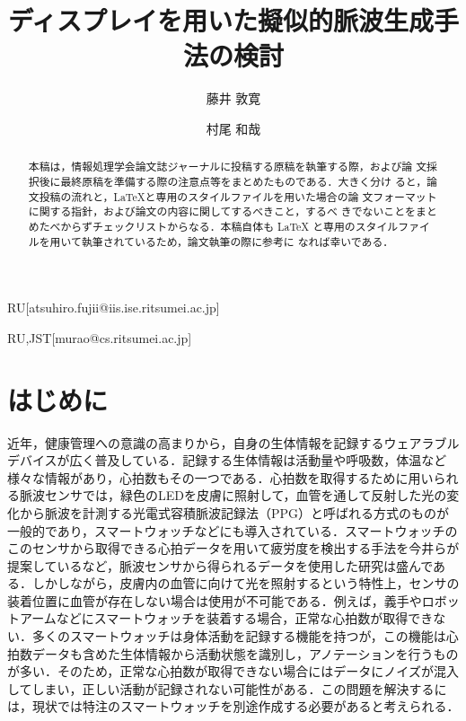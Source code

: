 \documentclass[submit,techrep]{ipsj}
\begin{document}
\title{ディスプレイを用いた擬似的脈波生成手法の検討}


\author{藤井 敦寛}{}{RU}[atsuhiro.fujii@iis.ise.ritsumei.ac.jp]
\author{村尾 和哉}{}{RU,JST}[murao@cs.ritsumei.ac.jp]

\begin{abstract}
	本稿は，情報処理学会論文誌ジャーナルに投稿する原稿を執筆する際，および論
	文採択後に最終原稿を準備する際の注意点等をまとめたものである．大きく分け
	ると，論文投稿の流れと，\LaTeX と専用のスタイルファイルを用いた場合の論
	文フォーマットに関する指針，および論文の内容に関してするべきこと，するべ
	きでないことをまとめたべからずチェックリストからなる．本稿自体も \LaTeX
	と専用のスタイルファイルを用いて執筆されているため，論文執筆の際に参考に
	なれば幸いである．
\end{abstract}

\maketitle

\section{はじめに}
\label{introduction}
近年，健康管理への意識の高まりから，自身の生体情報を記録するウェアラブルデバイスが広く普及している．記録する生体情報は活動量や呼吸数，体温など様々な情報があり，心拍数もその一つである．心拍数を取得するために用いられる脈波センサでは，緑色のLEDを皮膚に照射して，血管を通して反射した光の変化から脈波を計測する光電式容積脈波記録法（PPG）と呼ばれる方式のものが一般的であり，スマートウォッチなどにも導入されている．スマートウォッチのこのセンサから取得できる心拍データを用いて疲労度を検出する手法を今井ら\cite{fatigue_detection}が提案しているなど，脈波センサから得られるデータを使用した研究は盛んである．しかしながら，皮膚内の血管に向けて光を照射するという特性上，センサの装着位置に血管が存在しない場合は使用が不可能である．例えば，義手やロボットアームなどにスマートウォッチを装着する場合，正常な心拍数が取得できない．多くのスマートウォッチは身体活動を記録する機能を持つが，この機能は心拍数データも含めた生体情報から活動状態を識別し，アノテーションを行うものが多い．そのため，正常な心拍数が取得できない場合にはデータにノイズが混入してしまい，正しい活動が記録されない可能性がある．この問題を解決するには，現状では特注のスマートウォッチを別途作成する必要があると考えられる．
\par
\end{document}
